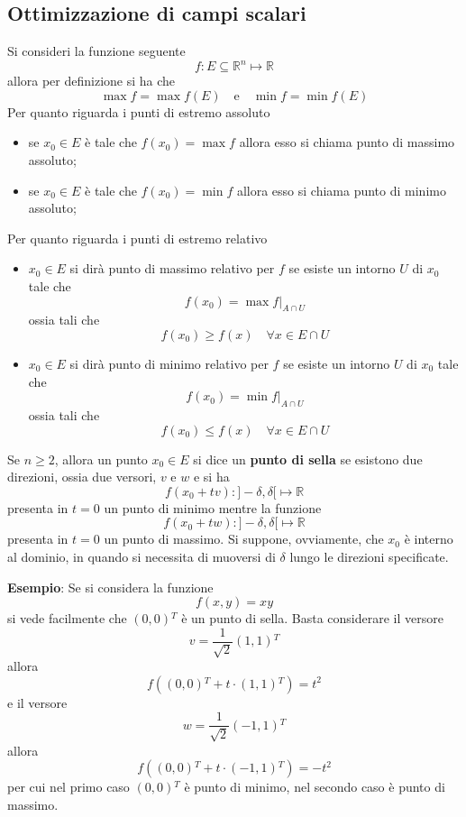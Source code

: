 \documentclass[a4paper]{extarticle}
\begin{document}
\vspace{1em}
\noindent
\subsection{Ottimizzazione di campi scalari}
Si consideri la funzione seguente
\[f : E \subseteq \mathbb{R}^n \longmapsto \mathbb{R}\]
allora per definizione si ha che
\[\max f = \max f(E) \hspace{1em} \text{e} \hspace{1em} \min f = \min f(E)\]
Per quanto riguarda i punti di estremo assoluto
\begin{itemize}
    \item se $x_0 \in E$ è tale che $f(x_0) = \max f$ allora esso si chiama punto di massimo assoluto;
    \item se $x_0 \in E$ è tale che $f(x_0) = \min f$ allora esso si chiama punto di minimo assoluto;
\end{itemize}
Per quanto riguarda i punti di estremo relativo
\begin{itemize}
    \item $x_0 \in E$ si dirà punto di massimo relativo per $f$ se esiste un intorno $U$ di $x_0$ tale che
    \[f(x_0) = \max f|_{A \cap U}\]
    ossia tali che
    \[f(x_0) \geq f(x) \hspace{1em} \forall x \in E \cap U\]

    \item $x_0 \in E$ si dirà punto di minimo relativo per $f$ se esiste un intorno $U$ di $x_0$ tale che
    \[f(x_0) = \min f|_{A \cap U}\]
    ossia tali che
    \[f(x_0) \leq f(x) \hspace{1em} \forall x \in E \cap U\]
\end{itemize}
Se $n \geq 2$, allora un punto $x_0 \in E$ si dice un \textbf{punto di sella} se esistono due direzioni, ossia due versori, $v$ e $w$ e si ha
\[f(x_0+tv) : ]-\delta,\delta[ \longmapsto \mathbb{R}\]
presenta in $t=0$ un punto di minimo mentre la funzione
\[f(x_0+tw) : ]-\delta,\delta[ \longmapsto \mathbb{R}\]
presenta in $t=0$ un punto di massimo. Si suppone, ovviamente, che $x_0$ è interno al dominio, in quando si necessita di muoversi di $\delta$ lungo le direzioni specificate.

\vspace{1em}
\noindent
\textbf{Esempio}: Se si considera la funzione
\[f(x,y)=xy\]
si vede facilmente che $(0,0){^T}$ è un punto di sella. Basta considerare il versore
\[v=\dfrac{1}{\sqrt{2}}(1,1){^T}\]
allora
\[f((0,0){^T} + t \cdot (1,1){^T}) = t^2\]
e il versore
\[w=\dfrac{1}{\sqrt{2}}(-1,1){^T}\]
allora
\[f((0,0){^T} + t \cdot (-1,1){^T}) = -t^2\]
per cui nel primo caso $(0,0){^T}$ è punto di minimo, nel secondo caso è punto di massimo.
\end{document}
